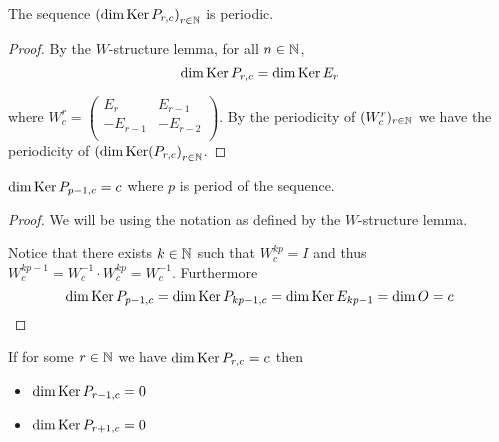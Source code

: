 \begin{proposition}
  The sequence $\left(\dim \operatorname{Ker} P_{r,c}\right)_{r\in\mathbb{N}}$
  is periodic.
\end{proposition}

\begin{proof}
  By the $W$-structure lemma, for all $n\in\mathbb{N}$,
  \[
  \dim\operatorname{Ker} P_{r,c}
  =
  \dim\operatorname{Ker} E_{r}
  \]

  where $W_{c}^{r}=\left(\begin{smallmatrix} E_{r} & E_{r-1}  \\ -E_{r-1} & -E_{r-2} \\\end{smallmatrix}\right)$.
  By the periodicity of $(W_{c}^{r})_{r\in\mathbb{N}}$ we have the
  periodicity of
  $\left(\dim\operatorname{Ker}(P_{r,c}\right)_{r\in\mathbb{N}}$.
\end{proof}

\begin{lemma}
  $\dim\operatorname{Ker} P_{p-1,c} = c$ where $p$ is period of the sequence.
\end{lemma}

\begin{proof}
  We will be using the notation as defined by the $W$-structure lemma.

  Notice that there exists $k\in\mathbb{N}$ such that $W_{c}^{kp} = I$ and
  thus $W_{c}^{kp-1} = W_{c}^{-1} \cdot W_{c}^{kp} = W_{c}^{-1}$.
  Furthermore
  \[
  \dim\operatorname{Ker} P_{p-1,c}
  =
  \dim\operatorname{Ker} P_{kp-1,c}
  =
  \dim\operatorname{Ker} E_{kp-1} = \dim O
  = c
  \]
\end{proof}

\begin{lemma}
  If for some $r\in\mathbb{N}$ we have $\dim\operatorname{Ker} P_{r,c} = c$ then
  \begin{itemize}
    \item $\dim\operatorname{Ker} P_{r-1,c} = 0$
    \item $\dim\operatorname{Ker} P_{r+1,c} = 0$
  \end{itemize}
\end{lemma}

